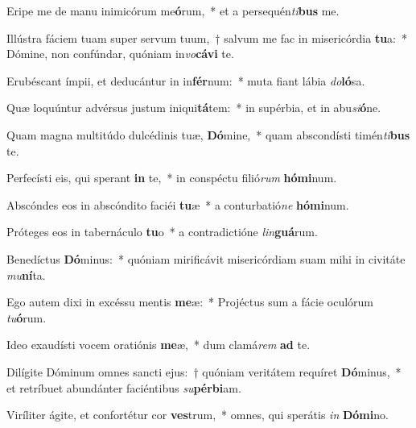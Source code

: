 \item Eripe me de manu inimicórum me\textbf{ó}rum,~* et a persequén\textit{ti}\textbf{bus} me.
\item Illústra fáciem tuam super servum tuum,~† salvum me fac in misericórdia \textbf{tu}a:~* Dómine, non confúndar, quóniam in\textit{vo}\textbf{cá}\textbf{vi} te.
\item Erubéscant ímpii, et deducántur in in\textbf{fér}num:~* muta fiant lábia \textit{do}\textbf{ló}sa.
\item Quæ loquúntur advérsus justum iniqui\textbf{tá}tem:~* in supérbia, et in abu\textit{si}\textbf{ó}ne.
\item Quam magna multitúdo dulcédinis tuæ, \textbf{Dó}mine,~* quam abscondísti timén\textit{ti}\textbf{bus} te.
\item Perfecísti eis, qui sperant \textbf{in} te,~* in conspéctu filió\textit{rum} \textbf{hó}\textbf{mi}num.
\item Abscóndes eos in abscóndito faciéi \textbf{tu}æ~* a conturbatió\textit{ne} \textbf{hó}\textbf{mi}num.
\item Próteges eos in tabernáculo \textbf{tu}o~* a contradictióne \textit{lin}\textbf{guá}rum.
\item Benedíctus \textbf{Dó}minus:~* quóniam mirificávit misericórdiam suam mihi in civitáte \textit{mu}\textbf{ní}ta.
\item Ego autem dixi in excéssu mentis \textbf{me}æ:~* Projéctus sum a fácie oculórum \textit{tu}\textbf{ó}rum.
\item Ideo exaudísti vocem oratiónis \textbf{me}æ,~* dum clamá\textit{rem} \textbf{ad} te.
\item Dilígite Dóminum omnes sancti ejus:~† quóniam veritátem requíret \textbf{Dó}minus,~* et retríbuet abundánter faciéntibus \textit{su}\textbf{pér}\textbf{bi}am.
\item Viríliter ágite, et confortétur cor \textbf{ves}trum,~* omnes, qui sperátis \textit{in} \textbf{Dó}\textbf{mi}no.
